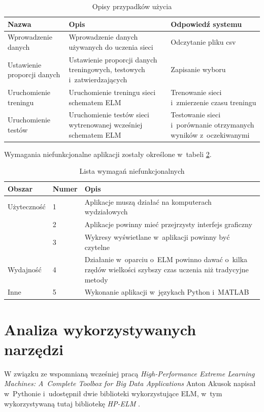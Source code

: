 \documentclass[pl]{minipw} %
\begin{document}
\begin{table}[H]
\caption{Opisy przypadków użycia}
\label{use_case_tab}
\centering
\begin{tabular}{|p{3.4cm}|p{5cm}|p{4cm}|}
\hline
\textbf{Nazwa} & \textbf{Opis} & \textbf{Odpowiedź systemu} \\
\hline
Wprowadzenie danych & Wprowadzenie danych używanych do uczenia sieci & Odczytanie pliku csv \\ \hline
Ustawienie proporcji danych & Ustawienie proporcji danych treningowych, testowych i~zatwierdzających & Zapisanie wyboru \\ \hline
Uruchomienie treningu & Uruchomienie treningu sieci schematem ELM & Trenowanie sieci i~zmierzenie czasu treningu \\ \hline
Uruchomienie testów & Uruchomienie testów sieci wytrenowanej wcześniej schematem ELM & Testowanie sieci i~porównanie otrzymanych wyników z~oczekiwanymi \\
\hline
\end{tabular}
\end{table}

Wymagania niefunkcjonalne aplikacji zostały określone w~tabeli \ref{niefunkcjonalne}.
\begin{table}[H]
\caption{Lista wymagań niefunkcjonalnych}
\label{niefunkcjonalne}
\begin{tabular}{|l|l|p{9.4cm}|}
\hline
\textbf{Obszar} & \textbf{Numer} & \textbf{Opis} \\
\hline
Użyteczność & 1 & Aplikacje muszą działać na komputerach wydziałowych \\
 & 2 & Aplikacje powinny mieć przejrzysty interfejs graficzny \\
 & 3 & Wykresy wyświetlane w~aplikacji powinny być czytelne \\
\hline
Wydajność & 4 & Działanie w~oparciu o~ELM powinno dawać o~kilka rzędów wielkości szybszy czas uczenia niż tradycyjne metody \\
\hline 
Inne & 5 & Wykonanie aplikacji w~językach Python i~MATLAB \\
\hline
\end{tabular}
\end{table}
\section{Analiza wykorzystywanych narzędzi}
W związku ze wspomnianą wcześniej pracą \textit{High-Performance Extreme Learning Machines: A~Complete Toolbox for Big Data Applications} Anton Akusok napisał w~Pythonie i~udostępnił dwie biblioteki wykorzystujące ELM, w~tym wykorzystywaną tutaj bibliotekę \textit{HP-ELM} \cite{hpelm}.
\end{document}
